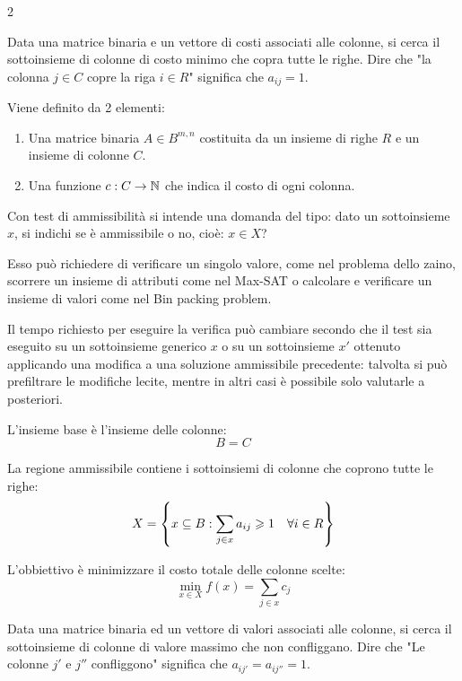 \documentclass[\main/main.tex]{subfiles}
\begin{document}
\clearpage
\begin{multicols}{2}
    \begin{problem}
        Data una matrice binaria e un vettore di costi associati alle colonne, si cerca il sottoinsieme di colonne di costo minimo che copra tutte le righe. Dire che "la colonna \(j \in C\) copre la riga \(i \in R\)" significa che \(a_{ij} = 1\).
    
        Viene definito da 2 elementi:
        \begin{enumerate}
            \item Una matrice binaria \(A \in B^{m, n}\) costituita da un insieme di righe \(R\) e un insieme di colonne \(C\).
            \item Una funzione \(c: C \rightarrow \mathbb{N}\) che indica il costo di ogni colonna.
        \end{enumerate}
    \end{problem}
    \begin{observation}
        Con test di ammissibilità si intende una domanda del tipo: dato un sottoinsieme \(x\), si indichi se è ammissibile o no, cioè: \(x\in X\)?
        
        Esso può richiedere di verificare un singolo valore, come nel problema dello zaino, scorrere un insieme di attributi come nel Max-SAT o calcolare e verificare un insieme di valori come nel Bin packing problem.
        
        Il tempo richiesto per eseguire la verifica può cambiare secondo che il test sia eseguito su un sottoinsieme generico \(x\) o su un sottoinsieme \(x'\) ottenuto applicando una modifica a una soluzione ammissibile precedente: talvolta si può prefiltrare le modifiche lecite, mentre in altri casi è possibile solo valutarle a posteriori.
    \end{observation}
    \begin{definition}
        L'insieme base è l'insieme delle colonne:
        \[
            B = C
        \]
    \end{definition}
    \begin{definition}
        La regione ammissibile contiene i sottoinsiemi di colonne che coprono tutte le righe:
        \[
            X = \left\{x \subseteq B: \sum_{j \in x} a_{ij} \geqslant 1 \quad \forall i \in R\right\}
        \]
    \end{definition}
    \begin{definition}
        L'obbiettivo è minimizzare il costo totale delle colonne scelte:
        \[
            \min_{x \in X} f(x) = \sum_{j \in x} c_{j}
        \]
    \end{definition}
    \begin{problem}
        Data una matrice binaria ed un vettore di valori associati alle colonne, si cerca il sottoinsieme di colonne di valore massimo che non confliggano. Dire che "Le colonne \(j'\) e \(j''\) confliggono" significa che \(a_{ij'} = a_{ij''} = 1\).
        

\end{problem}
\end{multicols}
\end{document}
